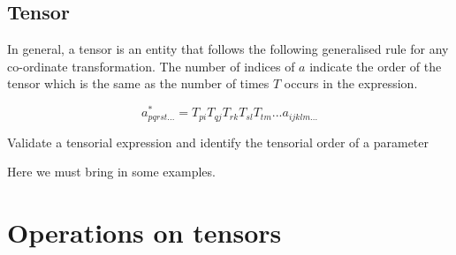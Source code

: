 \subsection{Tensor}


In general, a tensor is an entity that follows the following generalised rule for any co-ordinate transformation. The number of indices of $a$ indicate the order of the tensor which is the same as the number of times $T$ occurs in the expression.

\begin{equation}
\boxed{a^*_{pqrst...} = T_{pi}T_{qj}T_{rk}T_{sl}T_{tm}... a_{ijklm...} }
\end{equation}

\begin{lo2}
Validate a tensorial expression and identify the tensorial order of a parameter
\end{lo2}

Here we must bring in some examples.


\section{Operations on tensors}


